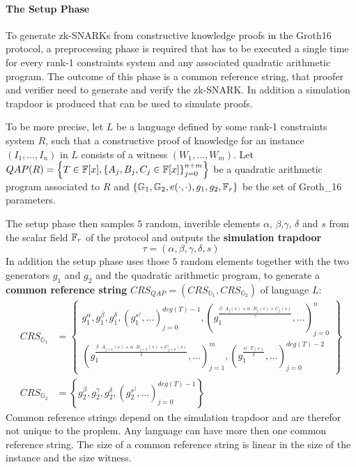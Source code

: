 \paragraph{The Setup Phase} To generate zk-SNARKs from constructive knowledge proofs in the Groth16 protocol, a preprocessing phase is required that has to be executed a single time for every rank-1 constraints system and any associated quadratic arithmetic program. The outcome of this phase is a common reference string, that proofer and verifier need to generate and verify the zk-SNARK. In addition a simulation trapdoor is produced that can be used to simulate proofs.

To be more precise, let $L$ be a language defined by some rank-1 constraints system $R$, such that a constructive proof of knowledge for an instance $(I_1,\ldots,I_n)$ in $L$ consists of a witness $(W_1,\ldots,W_m)$. Let $QAP(R) = \left\{T\in \mathbb{F}[x],\left\{A_j,B_j,C_j\in \mathbb{F}[x]\right\}_{j=0}^{n+m}\right\}$ be a quadratic arithmetic program associated to $R$ and $\{\mathbb{G}_1, \mathbb{G}_2, e(\cdot,\cdot), g_1, g_2, \mathbb{F}_r\}$ be the set of Groth\_16 parameters. 

The setup phase then samples $5$ random, inverible elements $\alpha$, $\beta$,$\gamma$, $\delta$ and $s$ from the scalar field $\mathbb{F}_r$ of the protocol and outputs the \textbf{simulation trapdoor}
\begin{equation}
\tau = (\alpha, \beta, \gamma, \delta, s)
\end{equation}
In addition the setup phase uses those $5$ random elements together with the two generators $g_1$ and $g_2$  and the quadratic arithmetic program, to generate a \textbf{common reference string} $CRS_{QAP}= (CRS_{\mathbb{G}_1},CRS_{\mathbb{G}_2})$ of language $L$:
\begin{align*}
CRS_{\mathbb{G}_{1}} &= \textstyle\left\{ \begin{array}{c}
g_1^\alpha,g_1^\beta,g_1^\delta,\left(g_1^{s^j},\ldots\right)_{j=0}^{deg(T)-1},
\left(g_1^{\frac{\beta\cdot A_{j}(s)+\alpha\cdot B_{j}(s)+C_{j}(s)}{\gamma}},\ldots\right)_{j=0}^n\\
\left(g_1^{\frac{\beta\cdot A_{j+n}(s)+\alpha\cdot B_{j+n}(s)+C_{j+n}(s)}{\delta}},\ldots\right)_{j=1}^m,\left(g_1^{\frac{s^{j}\cdot T(s)}{\delta}},\ldots\right)_{j=0}^{deg(T)-2}
\end{array}\right\} \\
CRS_{\mathbb{G}_{2}} &= \left\{g_2^\beta ,g_2^\gamma,g_2^\delta,\left(g_2^{s^j},\ldots\right) _{j=0}^{deg(T)-1}\right\}
\end{align*}
Common reference strings depend on the simulation trapdoor and are therefor not unique to the proplem. Any language can have more then one common reference string. The  size of a common reference string is linear in the size of the instance and the size witness.

